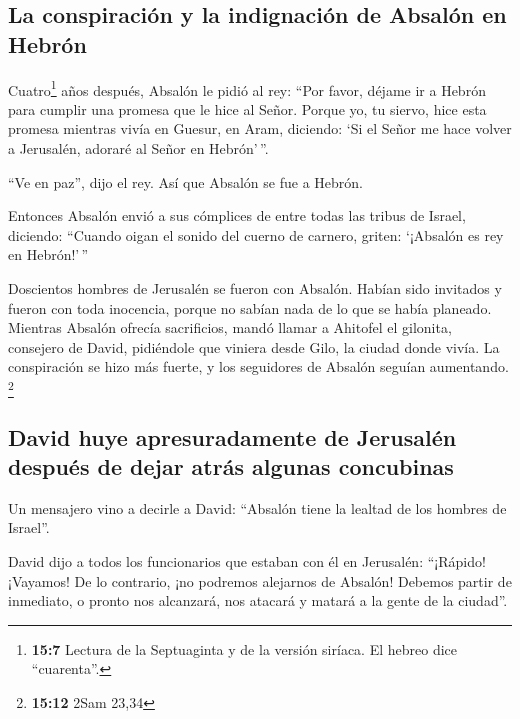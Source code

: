 \hypertarget{la-conspiraciuxf3n-y-la-indignaciuxf3n-de-absaluxf3n-en-hebruxf3n}{%
\subsection{La conspiración y la indignación de Absalón en
Hebrón}\label{la-conspiraciuxf3n-y-la-indignaciuxf3n-de-absaluxf3n-en-hebruxf3n}}

 Cuatro\footnote{\textbf{15:7} Lectura de la Septuaginta y
  de la versión siríaca. El hebreo dice ``cuarenta''.} años después,
Absalón le pidió al rey: ``Por favor, déjame ir a Hebrón para cumplir
una promesa que le hice al Señor.  Porque yo, tu siervo,
hice esta promesa mientras vivía en Guesur, en Aram, diciendo: `Si el
Señor me hace volver a Jerusalén, adoraré al Señor en Hebrón'\,''.

 ``Ve en paz'', dijo el rey. Así que Absalón se fue a
Hebrón.

 Entonces Absalón envió a sus cómplices de entre todas
las tribus de Israel, diciendo: ``Cuando oigan el sonido del cuerno de
carnero, griten: `¡Absalón es rey en Hebrón!'\,''

 Doscientos hombres de Jerusalén se fueron con Absalón.
Habían sido invitados y fueron con toda inocencia, porque no sabían nada
de lo que se había planeado.  Mientras Absalón ofrecía
sacrificios, mandó llamar a Ahitofel el gilonita, consejero de David,
pidiéndole que viniera desde Gilo, la ciudad donde vivía. La
conspiración se hizo más fuerte, y los seguidores de Absalón seguían
aumentando. \footnote{\textbf{15:12} 2Sam 23,34}

\hypertarget{david-huye-apresuradamente-de-jerusaluxe9n-despuuxe9s-de-dejar-atruxe1s-algunas-concubinas}{%
\subsection{David huye apresuradamente de Jerusalén después de dejar
atrás algunas
concubinas}\label{david-huye-apresuradamente-de-jerusaluxe9n-despuuxe9s-de-dejar-atruxe1s-algunas-concubinas}}

 Un mensajero vino a decirle a David: ``Absalón tiene la
lealtad de los hombres de Israel''.

 David dijo a todos los funcionarios que estaban con él
en Jerusalén: ``¡Rápido! ¡Vayamos! De lo contrario, ¡no podremos
alejarnos de Absalón! Debemos partir de inmediato, o pronto nos
alcanzará, nos atacará y matará a la gente de la ciudad''.

